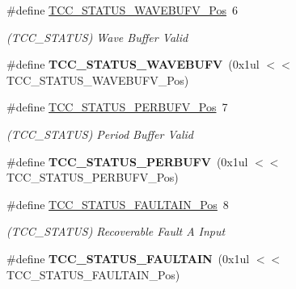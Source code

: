 \begin{DoxyCompactItemize}
\item 
\hypertarget{group___s_a_m_l21___t_c_c_ga03f895321fb2aeb2814547153ba9817a}{}\#define \hyperlink{group___s_a_m_l21___t_c_c_ga03f895321fb2aeb2814547153ba9817a}{T\+C\+C\+\_\+\+S\+T\+A\+T\+U\+S\+\_\+\+W\+A\+V\+E\+B\+U\+F\+V\+\_\+\+Pos}~6\label{group___s_a_m_l21___t_c_c_ga03f895321fb2aeb2814547153ba9817a}

\begin{DoxyCompactList}\small\item\em (T\+C\+C\+\_\+\+S\+T\+A\+T\+U\+S) Wave Buffer Valid \end{DoxyCompactList}\item 
\hypertarget{group___s_a_m_l21___t_c_c_gad4b9a4ecf03e6cbd72e355af820cc4ff}{}\#define {\bfseries T\+C\+C\+\_\+\+S\+T\+A\+T\+U\+S\+\_\+\+W\+A\+V\+E\+B\+U\+F\+V}~(0x1ul $<$$<$ T\+C\+C\+\_\+\+S\+T\+A\+T\+U\+S\+\_\+\+W\+A\+V\+E\+B\+U\+F\+V\+\_\+\+Pos)\label{group___s_a_m_l21___t_c_c_gad4b9a4ecf03e6cbd72e355af820cc4ff}

\item 
\hypertarget{group___s_a_m_l21___t_c_c_ga843e3eecd147cdef210163bddf0bad1b}{}\#define \hyperlink{group___s_a_m_l21___t_c_c_ga843e3eecd147cdef210163bddf0bad1b}{T\+C\+C\+\_\+\+S\+T\+A\+T\+U\+S\+\_\+\+P\+E\+R\+B\+U\+F\+V\+\_\+\+Pos}~7\label{group___s_a_m_l21___t_c_c_ga843e3eecd147cdef210163bddf0bad1b}

\begin{DoxyCompactList}\small\item\em (T\+C\+C\+\_\+\+S\+T\+A\+T\+U\+S) Period Buffer Valid \end{DoxyCompactList}\item 
\hypertarget{group___s_a_m_l21___t_c_c_ga3a16ea0498cd0aed6ec28a0566745cc3}{}\#define {\bfseries T\+C\+C\+\_\+\+S\+T\+A\+T\+U\+S\+\_\+\+P\+E\+R\+B\+U\+F\+V}~(0x1ul $<$$<$ T\+C\+C\+\_\+\+S\+T\+A\+T\+U\+S\+\_\+\+P\+E\+R\+B\+U\+F\+V\+\_\+\+Pos)\label{group___s_a_m_l21___t_c_c_ga3a16ea0498cd0aed6ec28a0566745cc3}

\item 
\hypertarget{group___s_a_m_l21___t_c_c_gabbd26f5b59175f8ca055c30042f23e6f}{}\#define \hyperlink{group___s_a_m_l21___t_c_c_gabbd26f5b59175f8ca055c30042f23e6f}{T\+C\+C\+\_\+\+S\+T\+A\+T\+U\+S\+\_\+\+F\+A\+U\+L\+T\+A\+I\+N\+\_\+\+Pos}~8\label{group___s_a_m_l21___t_c_c_gabbd26f5b59175f8ca055c30042f23e6f}

\begin{DoxyCompactList}\small\item\em (T\+C\+C\+\_\+\+S\+T\+A\+T\+U\+S) Recoverable Fault A Input \end{DoxyCompactList}\item 
\hypertarget{group___s_a_m_l21___t_c_c_ga872782e07b0376d7adcfc75072d0acae}{}\#define {\bfseries T\+C\+C\+\_\+\+S\+T\+A\+T\+U\+S\+\_\+\+F\+A\+U\+L\+T\+A\+I\+N}~(0x1ul $<$$<$ T\+C\+C\+\_\+\+S\+T\+A\+T\+U\+S\+\_\+\+F\+A\+U\+L\+T\+A\+I\+N\+\_\+\+Pos)\label{group___s_a_m_l21___t_c_c_ga872782e07b0376d7adcfc75072d0acae}


\end{DoxyCompactItemize}

